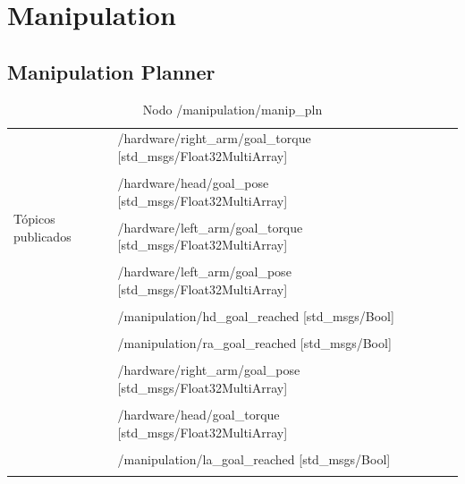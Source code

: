 \documentclass[user_manual.tex]{subfiles}
\begin{document}
\section{Manipulation}

\subsection{Manipulation Planner}

\begin{table}[H]
\begin{center}
\begin{tabular}{|l|p{6cm}|p{5cm}|}%
\hline

\multirow{9}{*}{Tópicos publicados}
& /hardware/right\_arm/goal\_torque [std\_msgs/Float32MultiArray] &  \\
& & \\
& /hardware/head/goal\_pose [std\_msgs/Float32MultiArray] &  \\
& & \\
& /hardware/left\_arm/goal\_torque [std\_msgs/Float32MultiArray] &  \\
& & \\
& /hardware/left\_arm/goal\_pose [std\_msgs/Float32MultiArray] &  \\
& & \\
& /manipulation/hd\_goal\_reached [std\_msgs/Bool] &  \\
& & \\
& /manipulation/ra\_goal\_reached [std\_msgs/Bool] &  \\
& & \\
& /hardware/right\_arm/goal\_pose [std\_msgs/Float32MultiArray] &  \\
& & \\
& /hardware/head/goal\_torque [std\_msgs/Float32MultiArray]  &  \\
& & \\
& /manipulation/la\_goal\_reached [std\_msgs/Bool] &  \\
& & \\
\cline{1-3}

\end{tabular}
\caption{Nodo  /manipulation/manip\_pln }
\label{manip pln node t1}
\end{center}
\end{table}
\end{document}
